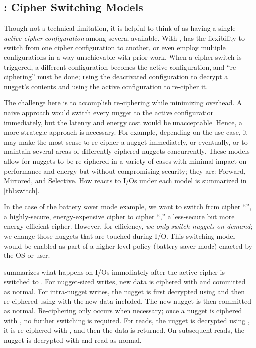 \subsection{\sysA: Cipher Switching Models}\label{subsec:des-switch}

Though not a technical limitation, it is helpful to think of \sys as having a
single {\em active cipher configuration} among several available. With \sysA,
\sys has the flexibility to switch from one cipher configuration to another, or
even employ multiple configurations in a way unachievable with prior work. When
a cipher switch is triggered, a different configuration becomes the active
configuration, and ``re-ciphering'' must be done; \ie using the deactivated
configuration to decrypt a nugget's contents and using the active configuration
to re-cipher it.

The challenge here is to accomplish re-ciphering while minimizing overhead. A
naive approach would switch every nugget to the active configuration
immediately, but the latency and energy cost would be unacceptable. Hence, a
more strategic approach is necessary. For example, depending on the use case,
it may make the most sense to re-cipher a nugget immediately, or eventually, or
to maintain several areas of differently-ciphered nuggets concurrently. These
models allow for nuggets to be re-ciphered in a variety of cases with minimal
impact on performance and energy but without compromising security; they
are: Forward, Mirrored, and Selective. How \sys reacts to I/Os under each model
is summarized in \cref{tbl:switch}.




 In the case of the battery saver mode example, we
want to switch from cipher ``\cone'', a highly-secure, energy-expensive cipher
to cipher ``\ctwo,'' a less-secure but more energy-efficient cipher. However,
for efficiency, {\em we only switch nuggets on demand}; \ie we change those
nuggets that are touched during I/O. This switching model would be enabled as
part of a higher-level policy (\ie battery saver mode) enacted by the OS or
user.

 summarizes what happens on I/Os immediately after the active
cipher is switched to \ctwo. For nugget-sized writes, new data is ciphered with
\ctwo and committed as normal. For intra-nugget writes, the nugget is first
decrypted using \cone and then re-ciphered using \ctwo with the new data
included. The new nugget is then committed as normal. Re-ciphering only occurs
when necessary; once a nugget is ciphered with \ctwo, no further switching is
required. For reads, the nugget is decrypted using \cone, it is re-ciphered with
\ctwo, and then the data is returned. On subsequent reads, the nugget is
decrypted with \ctwo and read as normal.

